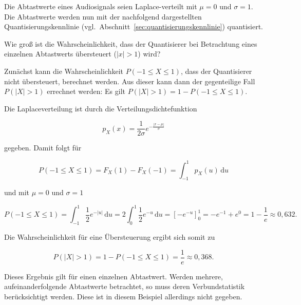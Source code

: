 \begin{beispiel}
Die Abtastwerte eines Audiosignals seien Laplace-verteilt mit $\mu = 0$ und $\sigma = 1$. Die Abtastwerte werden nun mit der nachfolgend dargestellten Quantisierungskennlinie (vgl.\ Abschnitt~\ref{sec:quantisierungskennlinie}) quantisiert.


Wie groß ist die Wahrscheinlichkeit, dass der Quantisierer bei Betrachtung eines einzelnen Abtastwerts übersteuert ($|x| > 1$) wird?

Zunächst kann die Wahrscheinlichkeit $P(-1 \leq X \leq 1)$, dass der Quantisierer nicht übersteuert, berechnet werden. Aus dieser kann dann der gegenteilige Fall $P(|X| > 1)$ errechnet werden: Es gilt $P(|X| > 1) = 1 - P(-1 \leq X \leq 1)$.

Die Laplaceverteilung ist durch die Verteilungsdichtefunktion

$$
p_X(x) = \frac{1}{2\sigma} e^{-\frac{|x-\mu|}{\sigma}}
$$

gegeben. Damit folgt für

$$
P(-1 \leq X \leq 1) = F_X(1) - F_X(-1) = \int_{-1}^{1} p_X(u)\,\mathrm{d}u
$$

und mit $\mu = 0$ und $\sigma = 1$

$$
P(-1 \leq X \leq 1) = \int_{-1}^{1} \frac{1}{2} e^{-|u|}\,\mathrm{d}u = 2\int_0^1 \frac{1}{2} e^{-u}\,\mathrm{d}u = \left[-e^{-u}\right]_0^1 = -e^{-1} + e^0 = 1 - \frac{1}{e} \approx 0{,}632.
$$

Die Wahrscheinlichkeit für eine Übersteuerung ergibt sich somit zu

$$
P(|X| > 1) = 1 - P(-1 \leq X \leq 1) = \frac{1}{e} \approx 0{,}368.
$$

Dieses Ergebnis gilt für einen einzelnen Abtastwert. Werden mehrere, aufeinanderfolgende Abtastwerte betrachtet, so muss deren Verbundstatistik berücksichtigt werden. Diese ist in diesem Beispiel allerdings nicht gegeben.
\end{beispiel}

